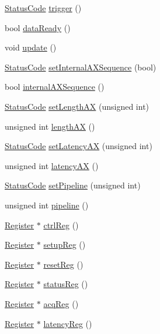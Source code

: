 \begin{DoxyCompactItemize}
\item 
\hyperlink{classStatusCode}{Status\+Code} \hyperlink{classA3PE_a75cd0377eb653ed22c4d258ab359f3d6}{trigger} ()
\item 
bool \hyperlink{classA3PE_a55df064c578bbc1e80a3b5fc05933f27}{data\+Ready} ()
\item 
void \hyperlink{classA3PE_a9e9b5ba5bd0ee19470c80761269a00f6}{update} ()
\item 
\hyperlink{classStatusCode}{Status\+Code} \hyperlink{classA3PE_ad5f953a38661104a87834cc8a63252fa}{set\+Internal\+A\+X\+Sequence} (bool)
\item 
bool \hyperlink{classA3PE_a4b9cf42bdd0a14e48807faa0956c59bd}{internal\+A\+X\+Sequence} ()
\item 
\hyperlink{classStatusCode}{Status\+Code} \hyperlink{classA3PE_a0300aa5c5ed02b82275c1de434196b9a}{set\+Length\+AX} (unsigned int)
\item 
unsigned int \hyperlink{classA3PE_acb95104d817db2e4f97e250f7e45b43d}{length\+AX} ()
\item 
\hyperlink{classStatusCode}{Status\+Code} \hyperlink{classA3PE_a53882e1272e8146e51837904ea00f33c}{set\+Latency\+AX} (unsigned int)
\item 
unsigned int \hyperlink{classA3PE_ab5970721a8172ae57b3da68040f58199}{latency\+AX} ()
\item 
\hyperlink{classStatusCode}{Status\+Code} \hyperlink{classA3PE_a5b3840fc8edd14427ac9fb4def3171d3}{set\+Pipeline} (unsigned int)
\item 
unsigned int \hyperlink{classA3PE_aeb22b2fcba4d14f234ad2d6dcef7948c}{pipeline} ()
\item 
\hyperlink{classRegister}{Register} $\ast$ \hyperlink{classA3PE_ae5fc5dac92af2b34a41be388586647be}{ctrl\+Reg} ()
\item 
\hyperlink{classRegister}{Register} $\ast$ \hyperlink{classA3PE_a94d96383e441153ed01e82cc12d2f593}{setup\+Reg} ()
\item 
\hyperlink{classRegister}{Register} $\ast$ \hyperlink{classA3PE_afd34bfbfd92838717c7cdec856b2a0b2}{reset\+Reg} ()
\item 
\hyperlink{classRegister}{Register} $\ast$ \hyperlink{classA3PE_af260fc8bce78935b7bad57c987574683}{status\+Reg} ()
\item 
\hyperlink{classRegister}{Register} $\ast$ \hyperlink{classA3PE_aca56dadafd70e670e75569ee03d91651}{acq\+Reg} ()
\item 
\hyperlink{classRegister}{Register} $\ast$ \hyperlink{classA3PE_a42dad20d5a1482431e73c64250b76185}{latency\+Reg} ()

\end{DoxyCompactItemize}
